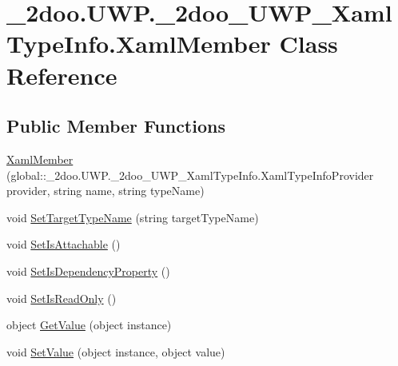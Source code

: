 \hypertarget{class__2doo_1_1_u_w_p_1_1__2doo___u_w_p___xaml_type_info_1_1_xaml_member}{
\section{\_\-2doo.UWP.\_\-2doo\_\-UWP\_\-XamlTypeInfo.XamlMember Class Reference}
\label{class__2doo_1_1_u_w_p_1_1__2doo___u_w_p___xaml_type_info_1_1_xaml_member}
}
\subsection*{Public Member Functions}
\begin{CompactItemize}
\item 
\hyperlink{class__2doo_1_1_u_w_p_1_1__2doo___u_w_p___xaml_type_info_1_1_xaml_member_4cd29cbfc8aef63ab59db87059cfba78}{XamlMember} (global::\_\-2doo.UWP.\_\-2doo\_\-UWP\_\-XamlTypeInfo.XamlTypeInfoProvider provider, string name, string typeName)
\item 
void \hyperlink{class__2doo_1_1_u_w_p_1_1__2doo___u_w_p___xaml_type_info_1_1_xaml_member_35eb1ed68f25e132f0a034ca4fd57d42}{SetTargetTypeName} (string targetTypeName)
\item 
void \hyperlink{class__2doo_1_1_u_w_p_1_1__2doo___u_w_p___xaml_type_info_1_1_xaml_member_111edc282f0c146b7cc91d665fc79cc4}{SetIsAttachable} ()
\item 
void \hyperlink{class__2doo_1_1_u_w_p_1_1__2doo___u_w_p___xaml_type_info_1_1_xaml_member_d01b84592e6f39109e59d976924e6553}{SetIsDependencyProperty} ()
\item 
void \hyperlink{class__2doo_1_1_u_w_p_1_1__2doo___u_w_p___xaml_type_info_1_1_xaml_member_686dd14e0203d301bd46a6a5b05d5575}{SetIsReadOnly} ()
\item 
object \hyperlink{class__2doo_1_1_u_w_p_1_1__2doo___u_w_p___xaml_type_info_1_1_xaml_member_cfe73298ff57227ee45e0049de158878}{GetValue} (object instance)
\item 
void \hyperlink{class__2doo_1_1_u_w_p_1_1__2doo___u_w_p___xaml_type_info_1_1_xaml_member_08032575a0901ca53824538588ba7d9d}{SetValue} (object instance, object value)
\end{CompactItemize}
